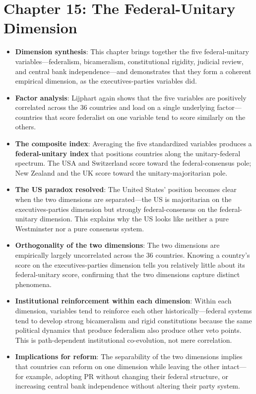 \documentclass[12pt]{article}
\begin{document}
\section{Chapter 15: The Federal-Unitary Dimension}

\begin{itemize}[leftmargin=*, itemsep=4pt]
    \item \textbf{Dimension synthesis}: This chapter brings together the five federal-unitary variables---federalism, bicameralism, constitutional rigidity, judicial review, and central bank independence---and demonstrates that they form a coherent empirical dimension, as the executives-parties variables did.
    \item \textbf{Factor analysis}: Lijphart again shows that the five variables are positively correlated across the 36 countries and load on a single underlying factor---countries that score federalist on one variable tend to score similarly on the others.
    \item \textbf{The composite index}: Averaging the five standardized variables produces a \textbf{federal-unitary index} that positions countries along the unitary-federal spectrum. The USA and Switzerland score toward the federal-consensus pole; New Zealand and the UK score toward the unitary-majoritarian pole.
    \item \textbf{The US paradox resolved}: The United States' position becomes clear when the two dimensions are separated---the US is majoritarian on the executives-parties dimension but strongly federal-consensus on the federal-unitary dimension. This explains why the US looks like neither a pure Westminster nor a pure consensus system.
    \item \textbf{Orthogonality of the two dimensions}: The two dimensions are empirically largely uncorrelated across the 36 countries. Knowing a country's score on the executives-parties dimension tells you relatively little about its federal-unitary score, confirming that the two dimensions capture distinct phenomena.
    \item \textbf{Institutional reinforcement within each dimension}: Within each dimension, variables tend to reinforce each other historically---federal systems tend to develop strong bicameralism and rigid constitutions because the same political dynamics that produce federalism also produce other veto points. This is path-dependent institutional co-evolution, not mere correlation.
    \item \textbf{Implications for reform}: The separability of the two dimensions implies that countries can reform on one dimension while leaving the other intact---for example, adopting PR without changing their federal structure, or increasing central bank independence without altering their party system.
\end{itemize}
\end{document}
